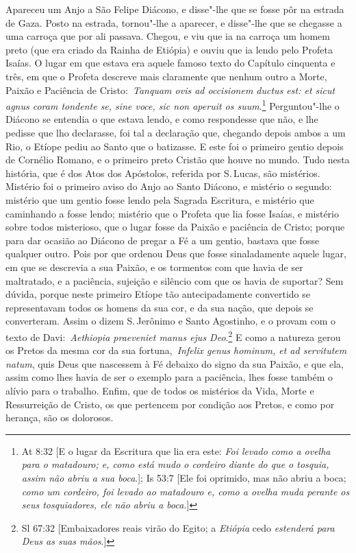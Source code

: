 Apareceu um Anjo a São Felipe Diácono, e disse"-lhe que se
fosse pôr na estrada de Gaza. Posto na estrada, tornou"-lhe a aparecer, e
disse"-lhe que se chegasse a uma carroça que por ali passava. Chegou, e
viu que ia na carroça um homem preto (que era criado da Rainha de
Etiópia) e ouviu que ia lendo pelo Profeta Isaías. O lugar em que estava
era aquele famoso texto do Capítulo cinquenta e três, em que o Profeta
descreve mais claramente que nenhum outro a Morte, Paixão e Paciência de
Cristo:~\emph{Tanquam ovis ad occisionem ductus est: et sicut agnus
coram tondente se, sine voce, sic non aperuit os
suum}.\footnote{At 8:32 [E o lugar da Escritura que lia era este: \textit{Foi levado como a ovelha para o matadouro; e, como está mudo o cordeiro diante do que o tosquia, assim não abriu a sua boca}.]; Is 53:7 [Ele foi oprimido, mas não abriu a boca; \textit{como um cordeiro, foi levado ao matadouro e, como a ovelha muda perante os seus tosquiadores, ele não abriu a boca.}]} Perguntou"-lhe o Diácono se entendia o que
estava lendo, e como respondesse que não, e lhe pedisse que lho
declarasse, foi tal a declaração que, chegando depois ambos a um Rio, o
Etíope pediu ao Santo que o batizasse. E este foi o primeiro gentio
depois de Cornélio Romano, e o primeiro preto Cristão que houve no
mundo. Tudo nesta história, que é dos Atos dos Apóstolos, referida por
S.\,Lucas, são mistérios. Mistério foi o primeiro aviso do Anjo ao Santo
Diácono, e mistério o segundo: mistério que um gentio fosse lendo pela
Sagrada Escritura, e mistério que caminhando a fosse lendo; mistério que
o Profeta que lia fosse Isaías, e mistério sobre todos misterioso, que o
lugar fosse da Paixão e paciência de Cristo; porque para dar ocasião ao
Diácono de pregar a Fé a um gentio, bastava que fosse qualquer outro.
Pois por que ordenou Deus que fosse sinaladamente aquele lugar, em que
se descrevia a sua Paixão, e os tormentos com que havia de ser
maltratado, e a paciência, sujeição e silêncio com que os havia de
suportar? Sem dúvida, porque neste primeiro Etíope tão antecipadamente
convertido se representavam todos os homens da sua cor, e da sua nação,
que depois se converteram. Assim o dizem S.\,Jerônimo e Santo Agostinho,
e o provam com o texto de Davi:~\emph{Aethiopia praeveniet manus ejus
Deo}.\footnote{Sl 67:32 [Embaixadores reais virão do Egito; a \textit{Etiópia} cedo \textit{estenderá para Deus as suas mãos}.]} E como a natureza gerou os Pretos da mesma cor
da sua fortuna,~\emph{Infelix genus hominum, et ad servitutem
natum}, quis Deus que nascessem à Fé debaixo do signo
da sua Paixão, e que ela, assim como lhes havia de ser o exemplo para a
paciência, lhes fosse também o alívio para o trabalho. Enfim, que de
todos os mistérios da Vida, Morte e Ressurreição de Cristo, os que
pertencem por condição aos Pretos, e como por herança, são os dolorosos.


